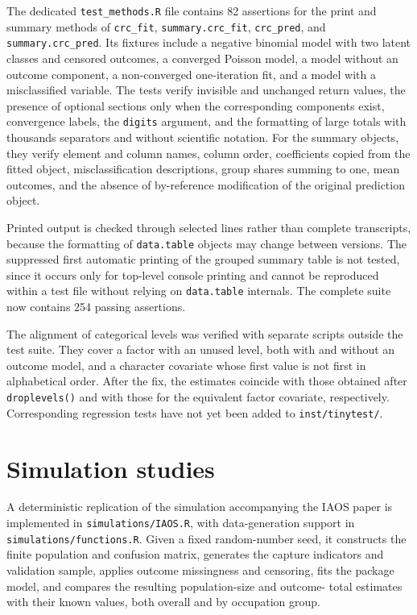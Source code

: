 \documentclass[11pt,letterpaper]{article}
\begin{document}
The dedicated \texttt{test\_methods.R} file contains 82 assertions for the
print and summary methods of \texttt{crc\_fit}, \texttt{summary.crc\_fit},
\texttt{crc\_pred}, and \texttt{summary.crc\_pred}. Its fixtures include a
negative binomial model with two latent classes and censored outcomes, a
converged Poisson model, a model without an outcome component, a
non-converged one-iteration fit, and a model with a misclassified variable.
The tests verify invisible and unchanged return values, the presence of
optional sections only when the corresponding components exist, convergence
labels, the \texttt{digits} argument, and the formatting of large totals with
thousands separators and without scientific notation. For the summary objects,
they verify element and column names, column order, coefficients copied from
the fitted object, misclassification descriptions, group shares summing to
one, mean outcomes, and the absence of by-reference modification of the
original prediction object.

Printed output is checked through selected lines rather than complete
transcripts, because the formatting of \texttt{data.table} objects may change
between versions. The suppressed first automatic printing of the grouped
summary table is not tested, since it occurs only for top-level console
printing and cannot be reproduced within a test file without relying on
\texttt{data.table} internals. The complete suite now contains 254 passing
assertions.

The alignment of categorical levels was verified with separate scripts
outside the test suite. They cover a factor with an unused level, both with
and without an outcome model, and a character covariate whose first value is
not first in alphabetical order. After the fix, the estimates coincide with
those obtained after \texttt{droplevels()} and with those for the equivalent
factor covariate, respectively. Corresponding regression tests have not yet
been added to \texttt{inst/tinytest/}.

\section{Simulation studies}

A deterministic replication of the simulation accompanying the IAOS paper is
implemented in \texttt{simulations/IAOS.R}, with data-generation support in
\texttt{simulations/functions.R}. Given a fixed random-number seed, it
constructs the finite population and confusion matrix, generates the capture
indicators and validation sample, applies outcome missingness and censoring,
fits the package model, and compares the resulting population-size and outcome-
total estimates with their known values, both overall and by occupation group.
\end{document}

